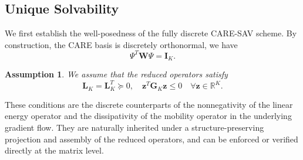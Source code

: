 \documentclass[10pt,reqno]{amsart}
\newtheorem{assumption}{Assumption}
\theoremstyle{remark}
\theoremstyle{definition}
\begin{document}
\subsection{Unique Solvability}
We first establish the well-posedness of the fully discrete CARE-SAV scheme. By construction, the CARE basis is discretely orthonormal, we have
\begin{equation}
  \Psi^{T} \boldsymbol{W} \Psi=\boldsymbol{I}_K.
\end{equation}

\begin{assumption}
\label{as1}
  We assume that the reduced operators satisfy
  \begin{equation}
    \boldsymbol{L}_K=\boldsymbol{L}_K^{T}\succeq0,\quad\boldsymbol z^{T}\boldsymbol{G}_K\boldsymbol z\le0 \quad \forall \boldsymbol z\in\mathbb R^K.
  \end{equation}
\end{assumption}
These conditions are the discrete counterparts of the nonnegativity of the linear energy operator and the dissipativity of the mobility operator in the underlying gradient flow. They are naturally inherited under a structure-preserving projection and assembly of the reduced operators, and can be enforced or verified directly at the matrix level.
\end{document}
